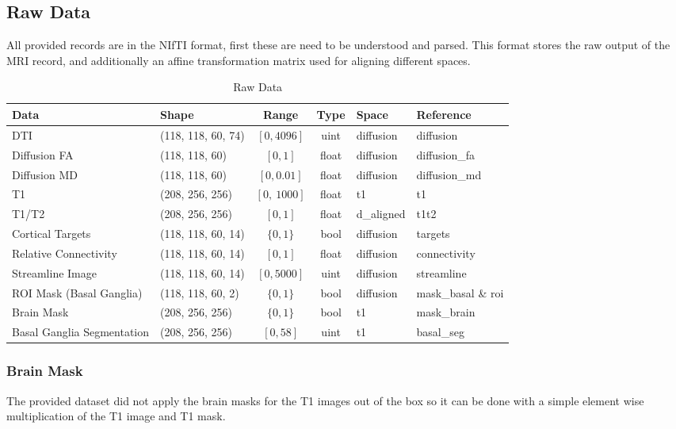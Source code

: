 \subsection{Raw Data}
All provided records are in the \ac{NIfTI} format, first these are need to be understood and parsed. This format stores the raw output of the \ac{MRI} record, and additionally an affine transformation matrix used for aligning different spaces.

\begin{table}[H]
\begin{adjustwidth}{-.5in}{-.5in}
\centering
\begin{tabular}[H]{|l|l|c|c|l|l|}
\hline
\textbf{Data} & \textbf{Shape} & \textbf{Range} & \textbf{Type} & \textbf{Space} & \textbf{Reference} \\ \hline
\ac{DTI} & (118, 118, 60, 74) & $[0,4096]$ & uint & diffusion & diffusion \\ \hline
Diffusion \ac{FA} & (118, 118, 60) & $[0,1]$ & float & diffusion & diffusion\_fa \\ \hline
Diffusion \ac{MD} & (118, 118, 60) & $[0,0.01]$ & float & diffusion & diffusion\_md \\ \hline
T1 & (208, 256, 256) & $[0,~1000]$ & float & t1 & t1 \\ \hline
T1/T2 & (208, 256, 256) & $[0,1]$ & float & d\_aligned & t1t2 \\ \hline
Cortical Targets & (118, 118, 60, 14) & $\{0,1\}$ & bool & diffusion & targets \\ \hline
Relative Connectivity & (118, 118, 60, 14) & $[0,1]$ & float & diffusion & connectivity \\ \hline
Streamline Image & (118, 118, 60, 14) & $[0,5000]$ & uint & diffusion & streamline \\ \hline
\ac{ROI} Mask (Basal Ganglia) & (118, 118, 60, 2) & $\{0,1\}$ & bool & diffusion & mask\_basal \& roi \\ \hline
Brain Mask & (208, 256, 256) & $\{0,1\}$ & bool & t1 & mask\_brain \\ \hline
Basal Ganglia Segmentation & (208, 256, 256) & $[0, 58]$ & uint & t1 & basal\_seg \\ \hline
\end{tabular}
\end{adjustwidth}
\caption{Raw Data}
\label{tab:datas1}
\end{table}

\subsubsection{Brain Mask}
The provided dataset did not apply the brain masks for the T1 images out of the box so it can be done with a simple element wise multiplication of the T1 image and T1 mask.

